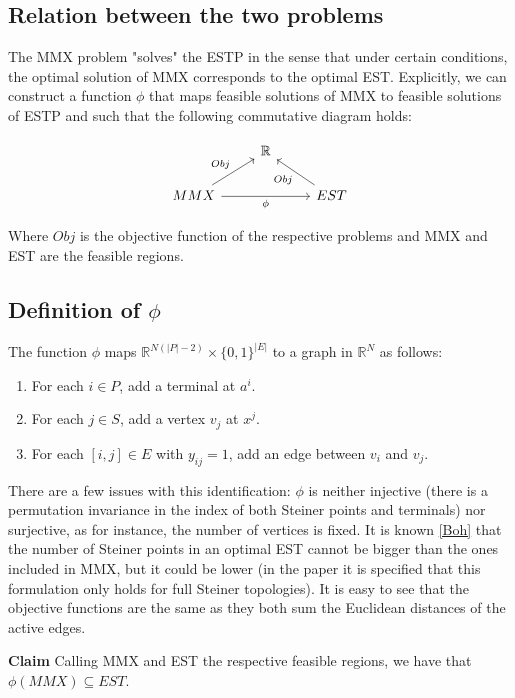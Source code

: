 \subsection{Relation between the two problems}

The MMX problem "solves" the ESTP in the sense that under certain conditions, the optimal solution of MMX corresponds to
the optimal EST.
Explicitly, we can construct a function $\phi$ that maps feasible solutions of MMX to feasible solutions of ESTP and such
that the following commutative diagram holds:

\[
    \begin{tikzcd}
        & \mathbb{R}  \\
        MMX \arrow[ur, "Obj"] \arrow[rr, "\phi"'] & & EST  \arrow[ul, "Obj"]
    \end{tikzcd}
\]

Where $Obj$ is the objective function of the respective problems and MMX and EST are the feasible regions.

\subsection{Definition of $\phi$}
The function $\phi$ maps $\mathbb{R}^{N (|P|-2)} \times \{0,1\}^{|E|}$ to a graph in $\mathbb{R}^N$ as follows:

\begin{enumerate}
    \item For each $i \in P$, add a terminal at $a^i$.
    \item For each $j \in S$, add a vertex $v_j$ at $x^j$.
    \item For each $[i,j] \in E$ with $y_{ij} = 1$, add an edge between $v_i$ and $v_j$.
\end{enumerate}

There are a few issues with this identification: $\phi$ is neither injective (there is a permutation invariance in the index of both
Steiner points and terminals) nor surjective, as for instance, the number of vertices is fixed. It is known \ref{Boh} that the number of Steiner points
in an optimal EST cannot be bigger than the ones included in MMX, but it could be lower (in the paper it is specified that
this formulation only holds for full Steiner topologies).
It is easy to see that the objective functions are the same as they both sum the Euclidean distances of the active edges.


\textbf{Claim} Calling MMX and EST the respective feasible regions, we have that $\phi(MMX) \subseteq EST$.

